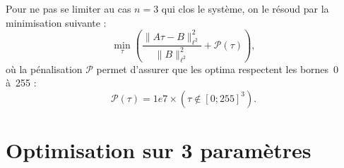 \documentclass[main.tex]{subfiles}
\begin{document}
Pour ne pas se limiter au cas $n=3$ qui clos le système, on le résoud par la minimisation suivante :
\begin{equation}\label{eq:min_optim_grey}
\min_{\tau} \left( \dfrac{\| A\tau - B \|^2_{\ell^2}}{\|B\|^2_{\ell^2}} + \mathcal{P}(\tau) \right),
\end{equation}
où la pénalisation $\mathcal{P}$ permet d'assurer que les optima respectent les bornes~0 à~255 :
\begin{equation}
\label{eq:penalisation_creneau}
\mathcal{P}(\tau) = 1e7 \times ( \tau \notin  [0;255]^3 ).
\end{equation}

\section{Optimisation sur 3 paramètres}
\end{document}
